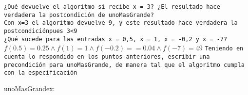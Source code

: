 \documentclass[10pt,a4paper]{article}
\begin{document}
\texttt{¿Qué devuelve el algoritmo si recibe x = 3? ¿El resultado hace verdadera la postcondición de unoMasGrande?\\
\color{red}Con x=3 el algoritmo devuelve 9, y este resultado hace verdadera la postcondiciónpues 3<9\\}
\salto{\baselineskip}
\texttt{¿Qué sucede para las entradas x = 0,5, x = 1, x = -0,2 y x = -7?\\
\color{red}$f(0.5)=0.25 \land f(1)=1 \land f(-0.2)== 0.04 \land f(-7)=49$}
\salto{\baselineskip}
\texttt{Teniendo en cuenta lo respondido en los puntos anteriores, escribir una precondición para unoMasGrande, de manera tal
que el algoritmo cumpla con la especificación\\}
\begin{proc}{unoMasGrande}{\In x: \float}{\float}
\end{proc}
\end{document}
